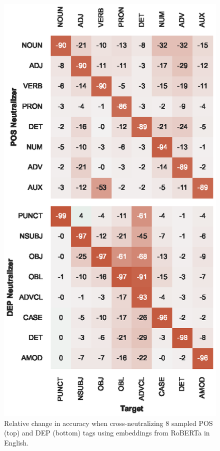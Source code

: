 \documentclass[11pt,a4paper]{article}
\begin{document}
\begin{figure}[t]
\centering
\includegraphics[width=\columnwidth]{roberta-base_multifigure_sampled.eps}
\caption{Relative change in accuracy when cross-neutralizing 8 sampled POS (top) and DEP (bottom) tags using embeddings from RoBERTa in English.}
\label{fig:xneutr_roberta}
\end{figure}
\end{document}

